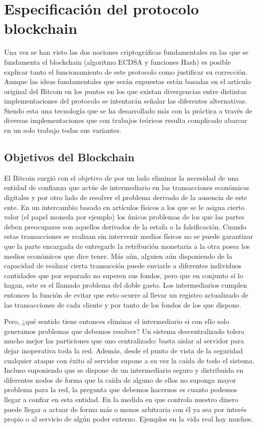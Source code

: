 \cleardoublepage

\chapter{Especificación del protocolo blockchain}
\label{cap3}
Una vez se han visto las dos nociones criptográficas fundamentales en las que se fundamenta el blockchain (algoritmo ECDSA y funciones Hash) es posible explicar tanto el funcionamiento de este protocolo como justificar su corrección. 
Aunque las ideas fundamentales que serán expuestas están basadas en el artículo original del Bitcoin \citep{bitcoin} en los puntos en los que existan divergencias entre distintas implementaciones del protocolo se intentarán señalar las diferentes alternativas. Siendo esta una tecnología que se ha desarrollado más con la práctica a través de diversas implementaciones que con trabajos teóricos resulta complicado abarcar en un solo trabajo todas sus variantes.

\section{Objetivos del Blockchain}\label{objetivos}
El Bitcoin surgió con el objetivo de por un lado eliminar la necesidad  de una entidad de confianza que actúe de intermediario en las transacciones económicas digitales y por otro lado de resolver el problema derivado de la ausencia de este ente. En un intercambio basado en artículos físicos a los que se le asigna cierto valor (el papel moneda por ejemplo) los únicos problemas de los que las partes deben preocuparse son aquellos derivados de la estafa o la falsificación. Cuando estas transacciones se realizan sin intervenir medios físicos no se puede garantizar que la parte encargada de entregarle la retribución monetaria a la otra posea los medios económicos que dice tener. Más aún, alguien aún disponiendo de la capacidad de realizar cierta transacción puede enviarle a diferentes individuos cantidades que por separado no superen sus fondos, pero que en conjunto sí lo hagan, este es el llamado problema del doble gasto. Los intermediarios cumplen entonces la función de evitar que esto ocurre al llevar un registro actualizado de las transacciones de cada cliente y por tanto de los fondos de los que dispone.

Pero, ¿qué sentido tiene entonces eliminar el intermediario si con ello solo generamos problemas que debemos resolver? Un sistema descentralizado tolera mucho mejor las particiones que uno centralizado: basta aislar al servidor para dejar inoperativa toda la red. Además, desde el punto de vista de la seguridad cualquier ataque con éxito al servidor supone a su vez la caída de todo el sistema. Incluso suponiendo que se dispone de un intermediario seguro y distribuido en diferentes nodos de forma que la caída de alguno de ellos no suponga mayor problema para la red, la pregunta que debemos hacernos es cuanto podemos llegar a confiar en esta entidad. En la medida en que controla nuestro dinero puede llegar a actuar de forma más o menos arbitraria con él ya sea por interés propio o al servicio de algún poder externo. Ejemplos en la vida real hay muchos.

